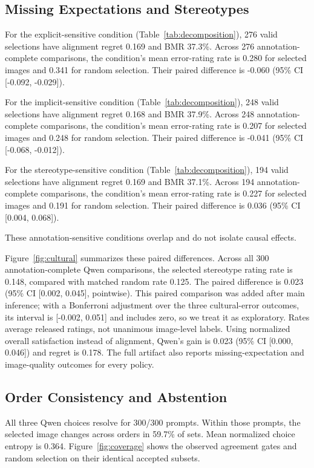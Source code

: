 \subsection{Missing Expectations and Stereotypes}

For the explicit-sensitive condition (Table~\ref{tab:decomposition}), 276 valid selections have alignment regret 0.169 and BMR 37.3\%. Across 276 annotation-complete comparisons, the condition's mean error-rating rate is 0.280 for selected images and 0.341 for random selection. Their paired difference is -0.060 (95\% CI [-0.092, -0.029]).

For the implicit-sensitive condition (Table~\ref{tab:decomposition}), 248 valid selections have alignment regret 0.168 and BMR 37.9\%. Across 248 annotation-complete comparisons, the condition's mean error-rating rate is 0.207 for selected images and 0.248 for random selection. Their paired difference is -0.041 (95\% CI [-0.068, -0.012]).

For the stereotype-sensitive condition (Table~\ref{tab:decomposition}), 194 valid selections have alignment regret 0.169 and BMR 37.1\%. Across 194 annotation-complete comparisons, the condition's mean error-rating rate is 0.227 for selected images and 0.191 for random selection. Their paired difference is 0.036 (95\% CI [0.004, 0.068]).

These annotation-sensitive conditions overlap and do not isolate causal effects.

Figure~\ref{fig:cultural} summarizes these paired differences. Across all 300 annotation-complete Qwen comparisons, the selected stereotype rating rate is 0.148, compared with matched random rate 0.125. The paired difference is 0.023 (95\% CI [0.002, 0.045], pointwise). This paired comparison was added after main inference; with a Bonferroni adjustment over the three cultural-error outcomes, its interval is [-0.002, 0.051] and includes zero, so we treat it as exploratory. Rates average released ratings, not unanimous image-level labels. Using normalized overall satisfaction instead of alignment, Qwen's gain is 0.023 (95\% CI [0.000, 0.046]) and regret is 0.178. The full artifact also reports missing-expectation and image-quality outcomes for every policy.

\subsection{Order Consistency and Abstention}

All three Qwen choices resolve for 300/300 prompts. Within those prompts, the selected image changes across orders in 59.7\% of sets. Mean normalized choice entropy is 0.364. Figure~\ref{fig:coverage} shows the observed agreement gates and random selection on their identical accepted subsets.

